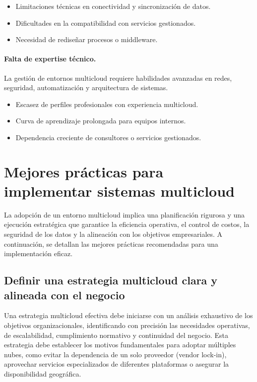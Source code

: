 {            \begin{itemize}
                \item Limitaciones técnicas en conectividad y sincronización de datos.
                \item Dificultades en la compatibilidad con servicios gestionados.
                \item Necesidad de rediseñar procesos o middleware.
            \end{itemize}
            
            \paragraph{Falta de expertise técnico.}
            La gestión de entornos multicloud requiere habilidades avanzadas en redes, seguridad, automatización y arquitectura de sistemas.
            
            \begin{itemize}
                \item Escasez de perfiles profesionales con experiencia multicloud.
                \item Curva de aprendizaje prolongada para equipos internos.
                \item Dependencia creciente de consultores o servicios gestionados.
            \end{itemize}
            
    \section{Mejores prácticas para implementar sistemas multicloud}
        La adopción de un entorno multicloud implica una planificación rigurosa y una ejecución estratégica que garantice la eficiencia operativa, el control de costos, la seguridad de los datos y la alineación con los objetivos empresariales. A continuación, se detallan las mejores prácticas recomendadas para una implementación eficaz.
            
        \subsection{Definir una estrategia multicloud clara y alineada con el negocio}
            Una estrategia multicloud efectiva debe iniciarse con un análisis exhaustivo de los objetivos organizacionales, identificando con precisión las necesidades operativas, de escalabilidad, cumplimiento normativo y continuidad del negocio. Esta estrategia debe establecer los motivos fundamentales para adoptar múltiples nubes, como evitar la dependencia de un solo proveedor (vendor lock-in), aprovechar servicios especializados de diferentes plataformas o asegurar la disponibilidad geográfica.
            
}
